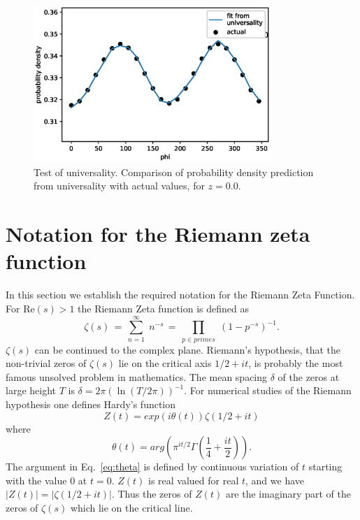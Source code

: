 \documentclass[twoside]{article}
\begin{document}
\begin{figure}
\centering
\includegraphics[width=0.8\textwidth]{z00.eps}
\caption[]{ 
 Test of universality. Comparison of probability density prediction from
 universality with actual values, for $z=0.0$. 
  }
\vspace{1mm}
\label{z00}
\end{figure}

\section{\label{sec2}Notation for the Riemann zeta function}

In this section we  establish the required notation for the 
Riemann Zeta Function. 
For $\mathrm{Re} (s) > 1$ the Riemann Zeta function is defined as
\begin{equation}
\zeta ( s ) \, = \, \sum^{\infty}_{n = 1} \; n^{-s} \, = \, \prod_{p \in primes} \;
\left( 1 - p^{-s} \right)^{-1}.
\label{eqRie}
\end{equation}
 $\zeta ( s )$ can be continued to
the complex plane. Riemann's hypothesis, that the non-trivial zeros of $\zeta ( s )$ lie on the 
critical axis $1/2+it$, is probably the most famous unsolved problem in mathematics.
The mean spacing $\delta$ of the zeros  at large height $T$ is $\delta = 2\pi(\ln (T/2\pi))^{-1}$. 
For numerical studies of the Riemann hypothesis one defines Hardy's function
\begin{equation}
Z(t)=exp(i\theta(t))\zeta(1/2 +it) 
\label{eq:hardy}
\end{equation}
where 
\begin{equation}
\theta(t) = arg (\pi^{it/2} \Gamma(\frac{1}{4} + \frac{it}{2})). 
\label{eq:theta}
\end{equation}
The argument in Eq.~\ref{eq:theta} is defined by continuous variation of $t$ starting with the value $0$ at $t = 0$.
$Z(t)$ is real valued for real $t$,
and we have $|Z(t)| = |\zeta(1/2+it)|$. Thus the zeros of $Z(t)$ are the imaginary part of the zeros 
of $\zeta(s)$ which lie on the critical line.  
\end{document}
